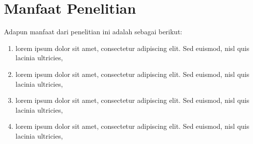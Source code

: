 \section{Manfaat Penelitian}
Adapun manfaat dari penelitian ini adalah sebagai berikut:
\begin{enumerate}
	\item lorem ipsum dolor sit amet, consectetur adipiscing elit. Sed euismod, nisl quis lacinia ultricies,
	\item lorem ipsum dolor sit amet, consectetur adipiscing elit. Sed euismod, nisl quis lacinia ultricies,
	\item lorem ipsum dolor sit amet, consectetur adipiscing elit. Sed euismod, nisl quis lacinia ultricies,
	\item lorem ipsum dolor sit amet, consectetur adipiscing elit. Sed euismod, nisl quis lacinia ultricies,

\end{enumerate}



\begin{comment}

\end{comment}